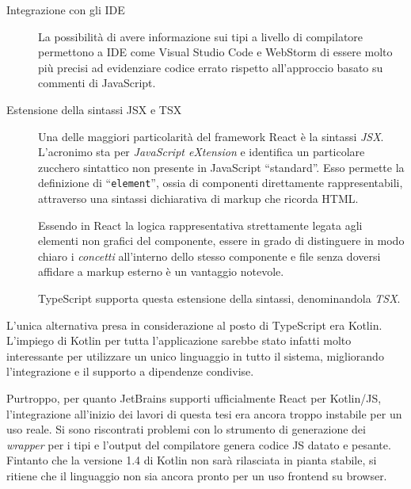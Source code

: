 \begin{description}
        \item[Integrazione con gli IDE]
          La possibilità di avere informazione sui tipi a livello di compilatore permettono a IDE come Visual Studio Code e WebStorm di essere molto più precisi ad evidenziare codice errato rispetto all'approccio basato su commenti di JavaScript.

        \item[Estensione della sintassi JSX e TSX]
          Una delle maggiori particolarità del framework React è la sintassi \emph{JSX}\@.
          L'acronimo sta per \emph{\emph{J}ava\emph{S}cript e\emph{X}tension} e identifica un particolare zucchero sintattico non presente in JavaScript ``standard''.
          Esso permette la definizione di ``\texttt{element}'', ossia di componenti direttamente rappresentabili, attraverso una sintassi dichiarativa di markup che ricorda HTML\@. 

          Essendo in React la logica rappresentativa strettamente legata agli elementi non grafici del componente, essere in grado di distinguere in modo chiaro i \emph{concetti}
          all'interno dello stesso componente e file senza doversi affidare a markup esterno è un vantaggio notevole.

          TypeScript supporta questa estensione della sintassi, denominandola \emph{TSX}.

      \end{description}

      L'unica alternativa presa in considerazione al posto di TypeScript era Kotlin.
      L'impiego di Kotlin per tutta l'applicazione sarebbe stato infatti molto interessante per utilizzare un unico linguaggio in tutto il sistema, migliorando l'integrazione e il supporto a dipendenze condivise.

      Purtroppo, per quanto JetBrains supporti ufficialmente React per Kotlin/JS, l'integrazione all'inizio dei lavori di questa tesi era ancora troppo instabile per un uso reale.
      Si sono riscontrati problemi con lo strumento di generazione dei \emph{wrapper} per i tipi e l'output del compilatore genera codice JS datato e pesante.
      Fintanto che la versione 1.4 di Kotlin non sarà rilasciata in pianta stabile, si ritiene che il linguaggio non sia ancora pronto per un uso frontend su browser.

